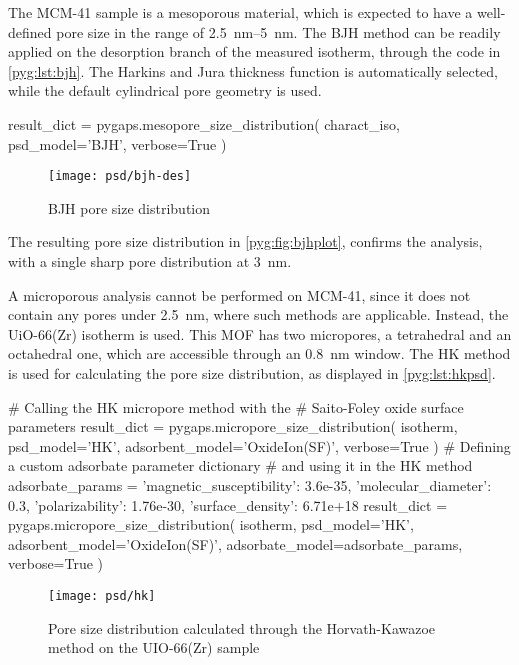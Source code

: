 The MCM-41 sample is a mesoporous material, which is expected
to have a well-defined pore size in the range of 
\SIrange{2.5}{5}{\nano\metre}. The \gls{BJH} method can be readily
applied on the desorption branch of the measured isotherm, through
the code in \autoref{pyg:lst:bjh}. The Harkins and Jura thickness
function is automatically selected, while the default cylindrical pore 
geometry is used.

\begin{python}[caption={PSD using the BJH method},%
    label={pyg:lst:bjh}]
result_dict = pygaps.mesopore_size_distribution(
    charact_iso,
    psd_model='BJH',
    verbose=True
)
\end{python}

\begin{figure}[!htb]
	\centering
	\texttt{[image: psd/bjh-des]}
	\caption{BJH pore size distribution}%
	\label{pyg:fig:bjhplot}
\end{figure}

The resulting pore size distribution in \autoref{pyg:fig:bjhplot},
confirms the analysis, with a single sharp pore distribution 
at \SI{3}{\nano\metre}.

A microporous analysis cannot be performed on MCM-41, since 
it does not contain any pores under \SI{2.5}{\nano\metre}, 
where such methods are applicable. Instead, the UiO-66(Zr)
isotherm is used. This \gls{MOF} has two micropores, a tetrahedral
and an octahedral one, which are accessible through an \SI{0.8}{\nano\metre}
window. The \gls{HK} method is used for calculating the pore size 
distribution, as displayed in \autoref{pyg:lst:hkpsd}.

\begin{python}[float=htb, caption={Using the HK method for PSD},%
    label={pyg:lst:hkpsd}]
# Calling the HK micropore method with the 
# Saito-Foley oxide surface parameters
result_dict = pygaps.micropore_size_distribution(
    isotherm,
    psd_model='HK',
    adsorbent_model='OxideIon(SF)',
    verbose=True
)
# Defining a custom adsorbate parameter dictionary 
# and using it in the HK method
adsorbate_params = {
    'magnetic_susceptibility': 3.6e-35,
    'molecular_diameter': 0.3,
    'polarizability': 1.76e-30,
    'surface_density': 6.71e+18
}
result_dict = pygaps.micropore_size_distribution(
    isotherm,
    psd_model='HK',
    adsorbent_model='OxideIon(SF)',
    adsorbate_model=adsorbate_params,
    verbose=True
)
\end{python}

\begin{figure}[!htb]
	\texttt{[image: psd/hk]}
	\caption{Pore size distribution calculated through the Horvath-Kawazoe method on the UIO-66(Zr) sample}%
	\label{fig:pyg:fig:hk}
\end{figure}

